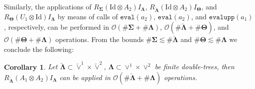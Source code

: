 \documentclass{amsart}
\newtheorem{corollary}[theorem]{Corollary}
\theoremstyle{definition}
\theoremstyle{remark}
\numberwithin{equation}{section}
\newcommand{\1}{\mathbb 1}
\begin{document}
Similarly, the applications of 
$R_{\bm{\Sigma}} (\mathrm{Id} \otimes A_2) I_{\bm{\Lambda}}$,
$R_{\bm{\breve{\Lambda}}} (\mathrm{Id} \otimes A_2) I_{\bm{\Theta}}$, and
$R_{\bm{\Theta}} (U_1 \otimes \mathrm{Id}) I_{\bm{\Lambda}}$
by means of calls of $\mathtt{eval}(a_2)$, $\mathtt{eval}(a_2)$, and $\mathtt{evalupp}(a_1)$, respectively,
can be performed in ${\mathcal O}(\# \bm{\Sigma}+ \# \bm{\Lambda})$, ${\mathcal O}(\#\bm{\breve{\Lambda}}+ \#\bm{\Theta})$, and ${\mathcal O}(\#\bm{\Theta}+ \#\bm{\Lambda})$ operations. From the bounds $\# \bm{\Sigma} \lesssim \# \bm{\breve{\Lambda}}$ and $\# \bm{\Theta} \lesssim \# \bm{\Lambda}$ we conclude the following:

\begin{corollary} Let $\bm{\breve{\Lambda}} \subset \breve{\vee}^1 \times \breve{\vee}^2$, $\bm{\Lambda} \subset \vee^1 \times \vee^2$ be finite double-trees, then $R_{\bm{\breve{\Lambda}}} (A_1 \otimes A_2) I_{\bm{\Lambda}}$ can be applied in ${\mathcal O}(\# \bm{\breve{\Lambda}}+\#\bm{\Lambda})$ operations. 
\end{corollary}
\end{document}
